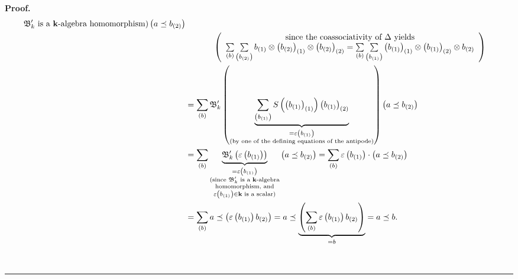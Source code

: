 \documentclass
[numbers=enddot,12pt,final,onecolumn,notitlepage,abstracton]{scrartcl}%
\theoremstyle{definition}
\newenvironment{proof}[1][Proof]{\noindent\textbf{#1.} }{\ \rule{0.5em}{0.5em}}
\newenvironment{verlong}{}{}
\let\sumnonlimits\sum
\renewcommand{\sum}{\sumnonlimits\limits}
\begin{document}
\begin{verlong}
\begin{proof}
\begin{align*}
{{\mathfrak{B}_{k}^{\prime}\text{ is a }\mathbf{k}\text{-algebra homomorphism)}%
}}\left(  a\left.  \preceq\right.  b_{\left(  2\right)  }\right) \\
&  \ \ \ \ \ \ \ \ \ \ \left(
\begin{array}
[c]{c}%
\text{since the coassociativity of }\Delta\text{ yields}\\
\sum_{\left(  b\right)  }\sum_{\left(  b_{\left(  2\right)  }\right)
}b_{\left(  1\right)  }\otimes\left(  b_{\left(  2\right)  }\right)  _{\left(
1\right)  }\otimes\left(  b_{\left(  2\right)  }\right)  _{\left(  2\right)
}=\sum_{\left(  b\right)  }\sum_{\left(  b_{\left(  1\right)  }\right)
}\left(  b_{\left(  1\right)  }\right)  _{\left(  1\right)  }\otimes\left(
b_{\left(  1\right)  }\right)  _{\left(  2\right)  }\otimes b_{\left(
2\right)  }%
\end{array}
\right) \\
&  =\sum_{\left(  b\right)  }\mathfrak{B}_{k}^{\prime}\left(  \underbrace{\sum
_{\left(  b_{\left(  1\right)  }\right)  }S\left(  \left(  b_{\left(
1\right)  }\right)  _{\left(  1\right)  }\right)  \left(  b_{\left(  1\right)
}\right)  _{\left(  2\right)  }}_{\substack{=\varepsilon\left(  b_{\left(
1\right)  }\right)  \\\text{(by one of the defining equations of the
antipode)}}}\right)  \left(  a\left.  \preceq\right.  b_{\left(  2\right)
}\right) \\
&  =\sum_{\left(  b\right)  }\underbrace{\mathfrak{B}_{k}^{\prime}\left(
\varepsilon\left(  b_{\left(  1\right)  }\right)  \right)  }%
_{\substack{=\varepsilon\left(  b_{\left(  1\right)  }\right)  \\\text{(since
}\mathfrak{B}_{k}^{\prime}\text{ is a }\mathbf{k}\text{-algebra}%
\\\text{homomorphism, and}\\\varepsilon\left(  b_{\left(  1\right)  }\right)
\in\mathbf{k}\text{ is a scalar)}}}\left(  a\left.  \preceq\right.  b_{\left(
2\right)  }\right)  =\sum_{\left(  b\right)  }\varepsilon\left(  b_{\left(
1\right)  }\right)  \cdot\left(  a\left.  \preceq\right.  b_{\left(  2\right)
}\right) \\
&  =\sum_{\left(  b\right)  }a\left.  \preceq\right.  \left(  \varepsilon
\left(  b_{\left(  1\right)  }\right)  b_{\left(  2\right)  }\right)
=a\left.  \preceq\right.  \underbrace{\left(  \sum_{\left(  b\right)
}\varepsilon\left(  b_{\left(  1\right)  }\right)  b_{\left(  2\right)
}\right)  }_{=b}=a\left.  \preceq\right.  b.
\end{align*}



\end{proof}
\end{verlong}
\end{document}
